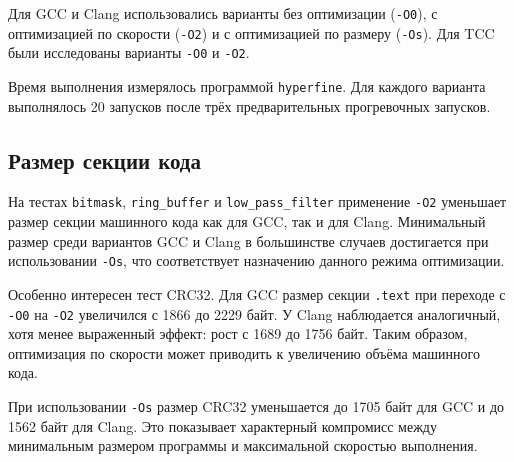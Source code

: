 \documentclass[12pt,a4paper]{article}
\begin{document}
Для GCC и Clang использовались варианты без оптимизации (\texttt{-O0}), с оптимизацией по скорости (\texttt{-O2}) и с оптимизацией по размеру (\texttt{-Os}). Для TCC были исследованы варианты \texttt{-O0} и \texttt{-O2}.

Время выполнения измерялось программой \texttt{hyperfine}. Для каждого варианта выполнялось 20 запусков после трёх предварительных прогревочных запусков.

\subsection{Размер секции кода}

\begin{table}[h]
\centering
\caption{Размер секции \texttt{.text}, байт}
\end{table}

На тестах \texttt{bitmask}, \texttt{ring\_buffer} и \texttt{low\_pass\_filter} применение \texttt{-O2} уменьшает размер секции машинного кода как для GCC, так и для Clang. Минимальный размер среди вариантов GCC и Clang в большинстве случаев достигается при использовании \texttt{-Os}, что соответствует назначению данного режима оптимизации.

Особенно интересен тест CRC32. Для GCC размер секции \texttt{.text} при переходе с \texttt{-O0} на \texttt{-O2} увеличился с 1866 до 2229 байт. У Clang наблюдается аналогичный, хотя менее выраженный эффект: рост с 1689 до 1756 байт. Таким образом, оптимизация по скорости может приводить к увеличению объёма машинного кода.

При использовании \texttt{-Os} размер CRC32 уменьшается до 1705 байт для GCC и до 1562 байт для Clang. Это показывает характерный компромисс между минимальным размером программы и максимальной скоростью выполнения.
\end{document}
